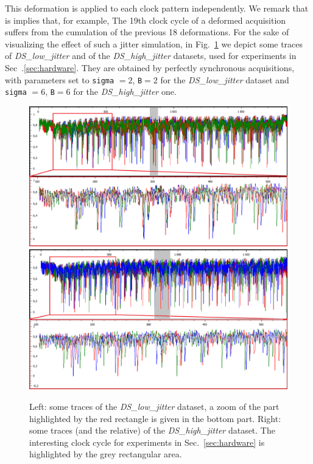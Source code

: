 This deformation is applied to each clock pattern independently. We remark that is implies that, for example, The 19th clock cycle of a deformed acquisition suffers from the cumulation of the previous 18 deformations. For the sake of visualizing the effect of such a jitter simulation, in Fig.~\ref{fig:jitter_traces} we depict some traces of  \emph{DS\_low\_jitter} and of the \emph{DS\_high\_jitter} datasets, used for experiments in Sec~.\ref{sec:hardware}. They are obtained by perfectly synchronous acquisitions, with parameters set to \texttt{sigma} $= 2$, \texttt{B}$= 2$ for the \emph{DS\_low\_jitter}  dataset and \texttt{sigma} $= 6$, \texttt{B}$= 6$ for the \emph{DS\_high\_jitter} one.

\begin{figure}
\includegraphics[width=.5\textwidth]{../Figures/CHES2017/jitter_2_2_framed.png} 
\includegraphics[width=.5\textwidth]{../Figures/CHES2017/jitter_6_6_framed.png} 
\caption[]{Left: some traces of the \emph{DS\_low\_jitter} dataset, a zoom of the part highlighted by the red rectangle is given in the bottom part. Right: some traces (and the relative) of the \emph{DS\_high\_jitter} dataset. The interesting clock cycle for experiments in Sec.~\ref{sec:hardware} is highlighted by the grey rectangular area.}\label{fig:jitter_traces}
\end{figure}


